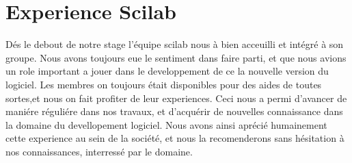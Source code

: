 \section*{Experience Scilab}

Dés le debout de notre stage l'équipe scilab nous à bien acceuilli et intégré à son groupe.
Nous avons toujours eue le sentiment dans faire parti, et que nous avions un
role important a jouer dans le developpement de ce la nouvelle version du logiciel.
Les membres on toujours était disponibles pour des aides de toutes sortes,et nous on fait
profiter de leur experiences. Ceci nous a permi d'avancer de maniére réguliére dans nos travaux,
et d'acquérir de nouvelles connaissance dans la domaine du devellopement logiciel.
Nous avons ainsi aprécié humainement cette experience au sein de la société, et nous la recomenderons
sans hésitation à nos connaissances, interressé par le domaine.





